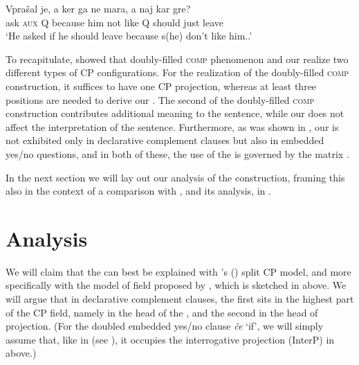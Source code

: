 \documentclass[output=paper,colorlinks,citecolor=brown]{langsci/langscibook}
\begin{document}
\begin{exe}
\ex \label{ex:plesnicar:thirtyfour}
\gll Vprašal je, a 	ker ga 	ne 	mara, 	a 	naj 	kar 	gre?\\
   ask \textsc{aux} Q because him	not	like Q	should	just	leave\\
\trans `He asked if he should leave because s(he) don’t like him..'
\end{exe}

\noindent To recapitulate,  showed that  doubly-filled \textsc{comp} phenomenon and our   realize two different types of CP configurations. For the realization of the doubly-filled \textsc{comp} construction, it suffices to have one CP projection, whereas at least three positions are needed to derive our  . The second  of the doubly-filled \textsc{comp} construction contributes additional meaning to the sentence, while our   does not affect the interpretation of the sentence. Furthermore, as was shown in , our  is not exhibited only in declarative complement clauses but also in embedded yes/no questions, and in both of these, the use of the  is governed by the matrix .

In the next section we will lay out our analysis of the   construction, framing this also in the context of a comparison with , and its analysis, in .


\section{Analysis}\label{sec:plesnicar:s5}
We will claim that the    can best be explained with \citeauthor{rizzi1997}'s (\citeyear{rizzi1997, rizzi2001}) split CP model, and more specifically with the model of   field proposed by \cite{mismas2015}, which is sketched in  above. We will argue that in declarative complement clauses, the first  sits in the highest part of the CP field, namely in the head of the , and the second  in the head of  projection. (For the doubled embedded yes/no clause  \textit{če} `if', we will simply assume that, like in  (see \citealt{rizzi2001}), it occupies the interrogative projection (InterP) in  above.)
\end{document}
